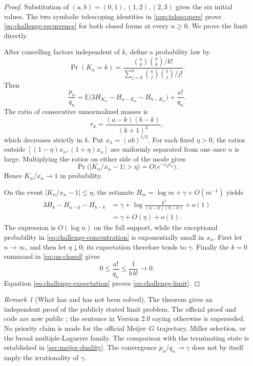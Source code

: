 \documentclass[11pt]{article}
\theoremstyle{definition}
\theoremstyle{remark}
\newtheorem{remark}[theorem]{Remark}
\begin{document}
\begin{proof}
Substitution of \((a,b)=(0,1),(1,2),(2,3)\) gives the six initial
values.  The two symbolic telescoping identities in
\cref{app:telescopers} prove \eqref{eq:challenge-recurrence} for both
closed forms at every \(n\ge0\).  We prove the limit directly.

After cancelling factors independent of \(k\), define a probability law by
\begin{equation}\label{eq:challenge-pmf}
 \Pr(K_n=k)=
 \frac{\binom ak\binom bk/k!}
 {\sum_{j=0}^{a}\binom aj\binom bj/j!}.
\end{equation}
Then
\begin{equation}\label{eq:challenge-expectation}
 \frac{p_n}{q_n}
 =\mathbb E\bigl(3H_{K_n}-H_{a-K_n}-H_{b-K_n}\bigr)
 +\frac{a!}{q_n}.
\end{equation}
The ratio of consecutive unnormalized masses is
\begin{equation}\label{eq:challenge-ratio}
 r_k=\frac{(a-k)(b-k)}{(k+1)^3},
\end{equation}
which decreases strictly in \(k\).  Put \(x_n=(ab)^{1/3}\).  For each
fixed \(\eta>0\), the ratios outside
\([(1-\eta)x_n,(1+\eta)x_n]\) are uniformly separated from one once
\(n\) is large.  Multiplying the ratios on either side of the mode gives
\begin{equation}\label{eq:challenge-concentration}
 \Pr\bigl(|K_n/x_n-1|>\eta\bigr)
 =O\bigl(e^{-c_\eta x_n}\bigr).
\end{equation}
Hence \(K_n/x_n\to1\) in probability.

On the event \(|K_n/x_n-1|\le\eta\), the estimate
\(H_m=\log m+\gamma+O(m^{-1})\) yields
\begin{align*}
 3H_k-H_{a-k}-H_{b-k}
 &=\gamma+\log\frac{k^3}{(a-k)(b-k)}+o(1)\\
 &=\gamma+O(\eta)+o(1).
\end{align*}
The expression is \(O(\log n)\) on the full support, while the exceptional
probability in \eqref{eq:challenge-concentration} is exponentially small in
\(x_n\).  First let \(n\to\infty\), and then let \(\eta\downarrow0\); its
expectation therefore tends to \(\gamma\).  Finally the
\(k=0\) summand in \eqref{eq:qn-closed} gives
\[
 0\le\frac{a!}{q_n}\le\frac1{b\,b!}\longrightarrow0.
\]
Equation \eqref{eq:challenge-expectation} proves
\eqref{eq:challenge-limit}.
\end{proof}

\begin{remark}[What has and has not been solved]
The theorem gives an independent proof of the publicly stated limit problem.
The official proof and code are now public \cite{RamanujanOfficial2026}; the
sentence in Version 2.0 saying otherwise is superseded.  No priority claim is
made for the official Meijer--\(G\) trajectory, Miller selection, or the broad
multiple-Laguerre family.  The comparison with the terminating state is
established in \cref{sec:meijer-duality}.
The convergence \(p_n/q_n\to\gamma\) does not by itself imply the
irrationality of \(\gamma\).
\end{remark}
\end{document}
